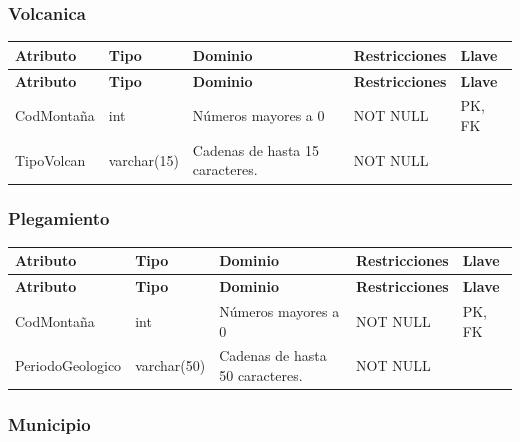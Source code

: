 \subsubsection*{Volcanica}

\begin{longtable}{p{2.2cm} p{2.2cm} p{5.8cm} p{4.2cm} p{1.5cm}}
\toprule
\textbf{Atributo} & \textbf{Tipo} & \textbf{Dominio} & \textbf{Restricciones} & \textbf{Llave} \\
\midrule
\endfirsthead

\toprule
\textbf{Atributo} & \textbf{Tipo} & \textbf{Dominio} & \textbf{Restricciones} & \textbf{Llave} \\
\midrule
\endhead

\bottomrule
\endfoot

CodMontaña
& int
& Números mayores a 0
& NOT NULL
& PK, FK \\

TipoVolcan
& varchar(15)
& Cadenas de hasta 15 caracteres.
& NOT NULL
&  \\

\end{longtable}


\subsubsection*{Plegamiento}

\begin{longtable}{p{3.2cm} p{2.2cm} p{5.3cm} p{4.0cm} p{1.7cm}}
\toprule
\textbf{Atributo} & \textbf{Tipo} & \textbf{Dominio} & \textbf{Restricciones} & \textbf{Llave} \\
\midrule
\endfirsthead

\toprule
\textbf{Atributo} & \textbf{Tipo} & \textbf{Dominio} & \textbf{Restricciones} & \textbf{Llave} \\
\midrule
\endhead

\bottomrule
\endfoot


CodMontaña
& int
& Números mayores a 0
& NOT NULL
& PK, FK \\

PeriodoGeologico
& varchar(50)
& Cadenas de hasta 50 caracteres.
& NOT NULL
&  \\

\end{longtable}


\subsubsection*{Municipio}

